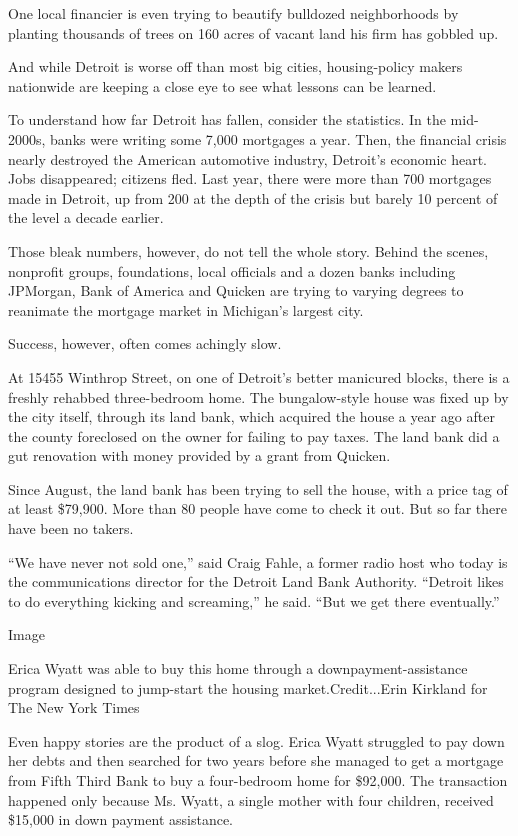 One local financier is even trying to beautify bulldozed neighborhoods
by planting thousands of trees on 160 acres of vacant land his firm has
gobbled up.

And while Detroit is worse off than most big cities, housing-policy
makers nationwide are keeping a close eye to see what lessons can be
learned.

To understand how far Detroit has fallen, consider the statistics. In
the mid-2000s, banks were writing some 7,000 mortgages a year. Then, the
financial crisis nearly destroyed the American automotive industry,
Detroit's economic heart. Jobs disappeared; citizens fled. Last year,
there were more than 700 mortgages made in Detroit, up from 200 at the
depth of the crisis but barely 10 percent of the level a decade earlier.

Those bleak numbers, however, do not tell the whole story. Behind the
scenes, nonprofit groups, foundations, local officials and a dozen banks
including JPMorgan, Bank of America and Quicken are trying to varying
degrees to reanimate the mortgage market in Michigan's largest city.

Success, however, often comes achingly slow.

At 15455 Winthrop Street, on one of Detroit's better manicured blocks,
there is a freshly rehabbed three-bedroom home. The bungalow-style house
was fixed up by the city itself, through its land bank, which acquired
the house a year ago after the county foreclosed on the owner for
failing to pay taxes. The land bank did a gut renovation with money
provided by a grant from Quicken.

Since August, the land bank has been trying to sell the house, with a
price tag of at least \$79,900. More than 80 people have come to check
it out. But so far there have been no takers.

``We have never not sold one,'' said Craig Fahle, a former radio host
who today is the communications director for the Detroit Land Bank
Authority. ``Detroit likes to do everything kicking and screaming,'' he
said. ``But we get there eventually.''

Image

Erica Wyatt was able to buy this home through a downpayment-assistance
program designed to jump-start the housing market.Credit...Erin Kirkland
for The New York Times

Even happy stories are the product of a slog. Erica Wyatt struggled to
pay down her debts and then searched for two years before she managed to
get a mortgage from Fifth Third Bank to buy a four-bedroom home for
\$92,000. The transaction happened only because Ms. Wyatt, a single
mother with four children, received \$15,000 in down payment assistance.

